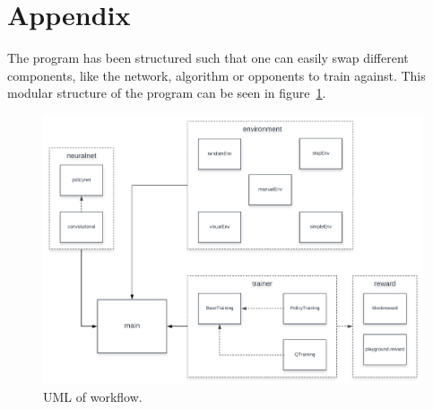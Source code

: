 \section*{Appendix}
\appendix
The program has been structured such that one can easily swap different components, like the network, algorithm or opponents to train against. This modular structure of the program can be seen in figure~\ref{fig:uml}.
\begin{figure}[htb]
    \centerline{\includegraphics[width=0.8\linewidth]{docs/article/inputs/02456-UML.pdf}}
    \caption{UML of workflow.}\label{fig:uml}
\end{figure}
